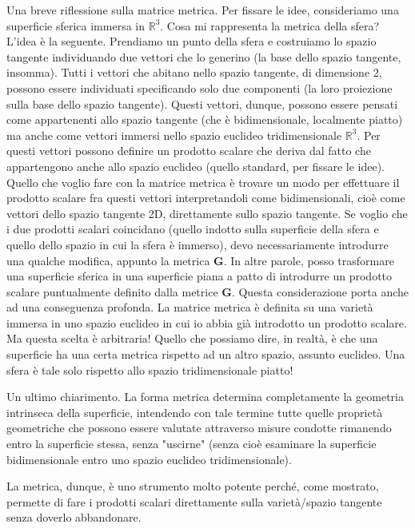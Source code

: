 \documentclass[a4paper,openany]{article}
\begin{document}
	\begin{tcolorbox}
		Una breve riflessione sulla matrice metrica. Per fissare le idee, consideriamo una superficie sferica immersa in $\mathbb{R}^{3}$. Cosa mi rappresenta la metrica della sfera? L'idea è la seguente. Prendiamo un punto della sfera e costruiamo lo spazio tangente individuando due vettori che lo generino (la base dello spazio tangente, insomma). Tutti i vettori che abitano nello spazio tangente, di dimensione 2, possono essere individuati specificando solo due componenti (la loro proiezione sulla base dello spazio tangente). Questi vettori, dunque, possono essere pensati come appartenenti allo spazio tangente (che è bidimensionale, localmente piatto) ma anche come vettori immersi nello spazio euclideo tridimensionale $\mathbb{R}^{3}$. Per questi vettori possono definire un prodotto scalare che deriva dal fatto che appartengono anche allo spazio euclideo (quello standard, per fissare le idee). Quello che voglio fare con la matrice metrica è trovare un modo per effettuare il prodotto scalare fra questi vettori interpretandoli come bidimensionali, cioè come vettori dello spazio tangente 2D, direttamente sullo spazio tangente. Se voglio che i due prodotti scalari coincidano (quello indotto sulla superficie della sfera e quello dello spazio in cui la sfera è immerso), devo necessariamente introdurre una qualche modifica, appunto la metrica \textbf{G}. In altre parole, posso trasformare una superficie sferica in una superficie piana a patto di introdurre un prodotto scalare puntualmente definito dalla metrice $\mathbf{G}$. Questa considerazione porta anche ad una conseguenza profonda. La matrice metrica è definita su una varietà immersa in uno spazio euclideo in cui io abbia già introdotto un prodotto scalare. Ma questa scelta è arbitraria! Quello che possiamo dire, in realtà, è che una superficie ha una certa metrica rispetto ad un altro spazio, assunto euclideo. Una sfera è tale solo rispetto allo spazio tridimensionale piatto!
		
		Un ultimo chiarimento. La forma metrica determina completamente la geometria intrinseca della superficie, intendendo con tale termine tutte quelle proprietà geometriche che possono essere valutate attraverso misure condotte rimanendo entro la superficie stessa, senza "uscirne" (senza cioè esaminare la superficie bidimensionale entro uno spazio euclideo tridimensionale).
		
	\end{tcolorbox}
	La metrica, dunque, è uno strumento molto potente perché, come mostrato, permette di fare i prodotti scalari direttamente sulla varietà/spazio tangente senza doverlo abbandonare.
\end{document}
